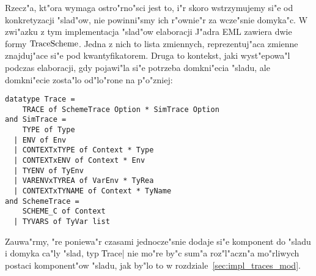 Rzecz"a, kt"ora wymaga ostro"rno"sci jest to,
i"r skoro wstrzymujemy si"e od konkretyzacji "slad"ow,
nie powinni"smy ich r"ownie"r za wcze"snie domyka"c.
W zwi"azku z tym implementacja "slad"ow elaboracji J"adra EML
zawiera dwie formy $\mbox{TraceScheme}$. Jedna z nich to lista zmiennych, 
reprezentuj"aca zmienne znajduj"ace si"e pod kwantyfikatorem.
Druga to kontekst, jaki wy\-st"e\-po\-wa"l podczas elaboracji,
gdy pojawi"la si"e potrzeba domkni"ecia "sladu, 
ale domkni"ecie zosta"lo od"lo"rone na p"o"zniej:
{\small
\begin{verbatim}
datatype Trace = 
    TRACE of SchemeTrace Option * SimTrace Option
and SimTrace = 
    TYPE of Type
  | ENV of Env
  | CONTEXTxTYPE of Context * Type
  | CONTEXTxENV of Context * Env
  | TYENV of TyEnv
  | VARENVxTYREA of VarEnv * TyRea
  | CONTEXTxTYNAME of Context * TyName
and SchemeTrace =
    SCHEME_C of Context
  | TYVARS of TyVar list
\end{verbatim}
}
Zauwa"rmy, "re poniewa"r czasami jednocze"snie
dodaje si"e komponent do "sladu i domyka ca"ly "slad,
typ \|Trace| nie mo"re by"c sum"a roz"l"aczn"a mo"rliwych postaci komponent"ow "sladu, 
jak by"lo to w rozdziale~\ref{sec:impl_traces_mod}.

